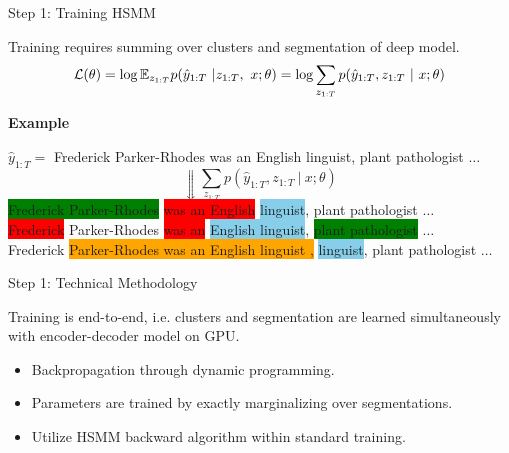\begin{frame}{Step 1: Training HSMM}

  Training requires summing over clusters and segmentation of deep model.
    \[ {\cal L}(\theta) =\log \mathbb{E}_{z_{1:T}} p(\hat{y}_{1:T} \ | z_{1:T}, \ x; \theta)  = \log \sum_{z_{1:T}} p(\hat{y}_{1:T}, z_{1:T} \ |\ x; \theta)\]
    \pause
    \centerline{\textbf{Example}}

    \begin{center}


$\hat{y}_{1:T} =$ Frederick Parker-Rhodes  was an English linguist, plant pathologist $\ldots$
      \[\Downarrow \sum_{z_{1:T}} p(\hat{y}_{1:T}, z_{1:T} \ |\ x; \theta)\]
\colorbox{green}{Frederick Parker-Rhodes}  \colorbox{red}{was an English} \colorbox{skyblue}{linguist}, \colorbox{redpurple}{plant pathologist} $\ldots$\\ \pause
\colorbox{red}{Frederick} \colorbox{redpurple}{Parker-Rhodes}  \colorbox{red}{was an\phantom{D}} \colorbox{skyblue}{English linguist}, \colorbox{green}{plant pathologist} $\ldots$\\ \pause
\colorbox{redpurple}{Frederick}  \colorbox{orange}{Parker-Rhodes was an English linguist ,} \colorbox{skyblue}{linguist}, \colorbox{redpurple}{plant pathologist} $\ldots$
    \end{center}
\end{frame}

\begin{frame}{Step 1: Technical Methodology}

  Training is end-to-end, i.e. clusters and segmentation are learned
  simultaneously with encoder-decoder model on GPU.

  \begin{itemize}
  \item  Backpropagation through dynamic programming.
  \item Parameters are trained by exactly marginalizing over segmentations.
  \item Utilize HSMM backward algorithm within standard training.
  \end{itemize}

\end{frame}


